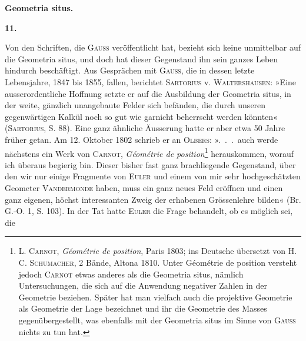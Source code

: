 \clearpage\begingroup{}
\renewcommand{\thefootnote}{\arabic{footnote})}\setcounter{footnote}{1}
\begin{center}
\par\medskip
\textbf{Geometria situs.}\par\medskip
\textbf{11.}\par\smallskip
{}
\end{center}
\noindent\hspace*{\parindent}Von den Schriften, die \textsc{Gauss} veröffentlicht hat, bezieht sich keine unmittelbar
auf die Geometria situs, und doch hat dieser Gegenstand ihn sein
ganzes Leben hindurch beschäftigt. Aus Gesprächen mit \textsc{Gauss}, die in dessen
letzte Lebensjahre, 1847 bis 1855, fallen, berichtet \textsc{Sartorius} v. \textsc{Waltershausen}:
»Eine ausserordentliche Hoffnung setzte er auf die Ausbildung der
Geometria situs, in der weite, gänzlich unangebaute Felder sich befänden, die
durch unseren gegenwärtigen Kalkül noch so gut wie garnicht beherrscht
werden könnten« (\textsc{Sartorius}, S. 88). Eine ganz ähnliche Äusserung hatte er
aber etwa 50 Jahre früher getan. Am 12. Oktober 1802 schrieb er an \textsc{Olbers}:
».\ .\ .\ auch werde nächstens ein Werk von \textsc{Carnot}, \textit{Géométrie de position}\footnote{L. \textsc{Carnot}, \textit{Géométrie de position}, Paris 1803; ins Deutsche übersetzt von H. C. \textsc{Schumacher}, 2 Bände, Altona 1810. Unter Géométrie de position versteht jedoch \textsc{Carnot} etwas anderes als die Geometria situs, nämlich Untersuchungen, die sich auf die Anwendung negativer Zahlen in der Geometrie beziehen. Später hat man vielfach auch die projektive Geometrie als Geometrie der Lage bezeichnet und ihr die Geometrie des Masses gegenübergestellt, was ebenfalls mit der Geometria situs im Sinne von \textsc{Gauss} nichts zu tun hat.}
herauskommen, worauf ich überaus begierig bin. Dieser bisher fast ganz
brachliegende Gegenstand, über den wir nur einige Fragmente von \textsc{Euler}
und einem von mir sehr hochgeschätzten Geometer \textsc{Vandermonde} haben, muss
ein ganz neues Feld eröffnen und einen ganz eigenen, höchst interessanten
Zweig der erhabenen Grössenlehre bilden« (Br. G.-O. 1, S. 103).
\clearpage{}\setcounter{footnote}{0}
\noindent\hspace*{\parindent}In der Tat hatte \textsc{Euler} die Frage behandelt, ob es möglich sei, die
